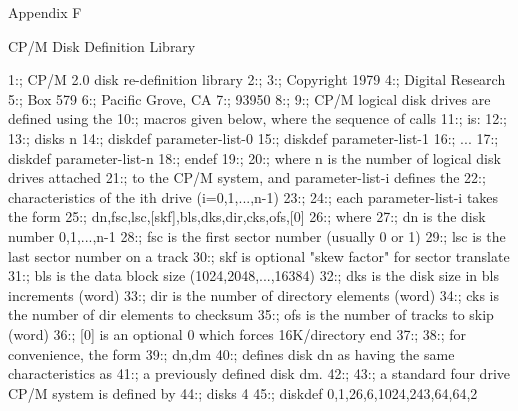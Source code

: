 

                                        Appendix F

                               CP/M Disk Definition Library


  1:;                       CP/M 2.0 disk re-definition library
  2:;
  3:;                       Copyright   1979
  4:;                       Digital Research
  5:;                       Box 579
  6:;                       Pacific Grove, CA
  7:;                       93950
  8:;
  9:;                       CP/M logical disk drives are defined using the
 10:;                       macros given below, where the sequence of calls
 11:;                       is:
 12:;                        
 13:;                       disks n
 14:;                       diskdef parameter-list-0
 15:;                       diskdef parameter-list-1
 16:;                       ...
 17:;                       diskdef parameter-list-n
 18:;                       endef
 19:;
 20:;                       where n is the number of logical disk drives attached
 21:;                       to the CP/M system, and parameter-list-i defines the
 22:;                       characteristics of the ith drive (i=0,1,...,n-1)
 23:; 
 24:;                       each parameter-list-i takes the form
 25:;                                dn,fsc,lsc,[skf],bls,dks,dir,cks,ofs,[0]
 26:;                       where
 27:;                       dn       is the disk number 0,1,...,n-1
 28:;                       fsc      is the first sector number (usually 0 or 1)
 29:;                       lsc      is the last sector number on a track
 30:;                       skf      is optional "skew factor" for sector translate
 31:;                       bls      is the data block size (1024,2048,...,16384)
 32:;                       dks      is the disk size in bls increments (word)
 33:;                       dir      is the number of directory elements (word)
 34:;                       cks      is the number of dir elements to checksum
 35:;                       ofs      is the number of tracks to skip (word)
 36:;                       [0]      is an optional 0 which forces 16K/directory end
 37:; 
 38:;                       for convenience, the form
 39:;                                dn,dm
 40:;                       defines disk dn as having the same characteristics as
 41:;                       a previously defined disk dm.
 42:;
 43:;                       a standard four drive CP/M system is defined by
 44:;                                disks               4
 45:;                                diskdef             0,1,26,6,1024,243,64,64,2
